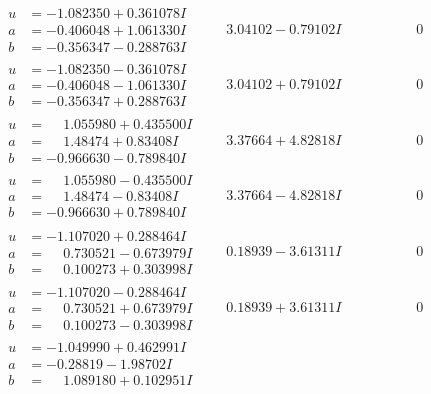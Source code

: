 \documentclass[1p]{elsarticle_modified}
\theoremstyle{definition}
\begin{document}
$$\begin{array}{c|c|c}
\begin{aligned}
u &= -1.082350 + 0.361078 I \\
a &= -0.406048 + 1.061330 I \\
b &= -0.356347 - 0.288763 I\end{aligned}
 & \phantom{-}3.04102 - 0.79102 I & \phantom{-0.000000 } 0 \\ \hline\begin{aligned}
u &= -1.082350 - 0.361078 I \\
a &= -0.406048 - 1.061330 I \\
b &= -0.356347 + 0.288763 I\end{aligned}
 & \phantom{-}3.04102 + 0.79102 I & \phantom{-0.000000 } 0 \\ \hline\begin{aligned}
u &= \phantom{-}1.055980 + 0.435500 I \\
a &= \phantom{-}1.48474 + 0.83408 I \\
b &= -0.966630 - 0.789840 I\end{aligned}
 & \phantom{-}3.37664 + 4.82818 I & \phantom{-0.000000 } 0 \\ \hline\begin{aligned}
u &= \phantom{-}1.055980 - 0.435500 I \\
a &= \phantom{-}1.48474 - 0.83408 I \\
b &= -0.966630 + 0.789840 I\end{aligned}
 & \phantom{-}3.37664 - 4.82818 I & \phantom{-0.000000 } 0 \\ \hline\begin{aligned}
u &= -1.107020 + 0.288464 I \\
a &= \phantom{-}0.730521 - 0.673979 I \\
b &= \phantom{-}0.100273 + 0.303998 I\end{aligned}
 & \phantom{-}0.18939 - 3.61311 I & \phantom{-0.000000 } 0 \\ \hline\begin{aligned}
u &= -1.107020 - 0.288464 I \\
a &= \phantom{-}0.730521 + 0.673979 I \\
b &= \phantom{-}0.100273 - 0.303998 I\end{aligned}
 & \phantom{-}0.18939 + 3.61311 I & \phantom{-0.000000 } 0 \\ \hline\begin{aligned}
u &= -1.049990 + 0.462991 I \\
a &= -0.28819 - 1.98702 I \\
b &= \phantom{-}1.089180 + 0.102951 I\end{aligned}

\end{array}$$
\end{document}
